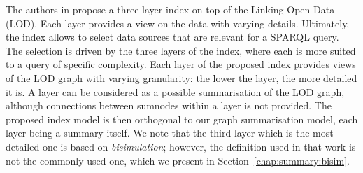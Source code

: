 The authors in \cite{konrath:jws:2012} propose a three-layer index on top of the Linking Open Data (LOD). Each layer provides a view on the data with varying details. Ultimately, the index allows to select data sources that are relevant for a SPARQL query. The selection is driven by the three layers of the index, where each is more suited to a query of specific complexity.
Each layer of the proposed index provides views of the LOD graph with varying granularity: the lower the layer, the more detailed it is. A layer can be considered as a possible summarisation of the LOD graph, although connections between sumnodes within a layer is not provided. The proposed index model is then orthogonal to our graph summarisation model, each layer being a summary itself.
We note that the third layer which is the most detailed one is based on \emph{bisimulation}; however, the definition used in that work is not the commonly used one, which we present in Section~\ref{chap:summary:bisim}.





